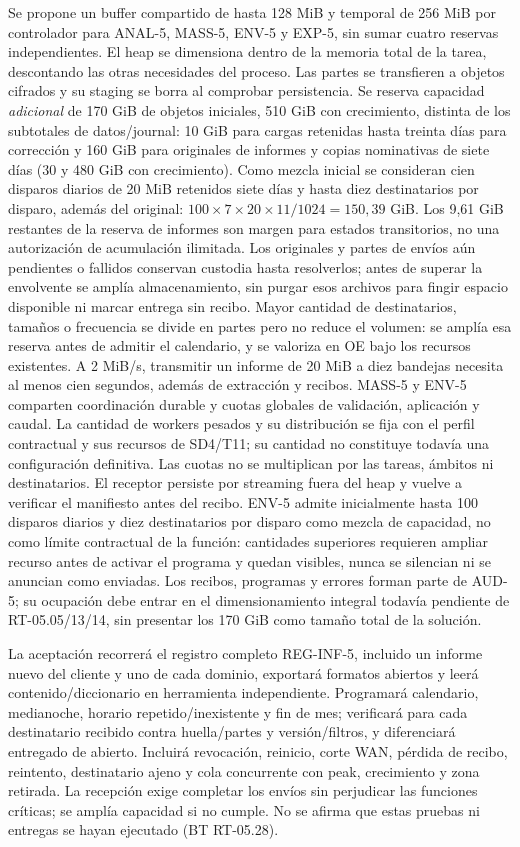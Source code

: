 Se propone un buffer compartido de hasta 128 MiB y temporal de 256 MiB por controlador para ANAL-5, MASS-5, ENV-5 y EXP-5, sin sumar cuatro reservas independientes. El heap se dimensiona dentro de la memoria total de la tarea, descontando las otras necesidades del proceso. Las partes se transfieren a objetos cifrados y su staging se borra al comprobar persistencia. Se reserva capacidad \emph{adicional} de 170 GiB de objetos iniciales, 510 GiB con crecimiento, distinta de los subtotales de datos/journal: 10 GiB para cargas retenidas hasta treinta días para corrección y 160 GiB para originales de informes y copias nominativas de siete días (30 y 480 GiB con crecimiento). Como mezcla inicial se consideran cien disparos diarios de 20 MiB retenidos siete días y hasta diez destinatarios por disparo, además del original: $100\times7\times20\times11/1024=150,39$ GiB. Los 9,61 GiB restantes de la reserva de informes son margen para estados transitorios, no una autorización de acumulación ilimitada. Los originales y partes de envíos aún pendientes o fallidos conservan custodia hasta resolverlos; antes de superar la envolvente se amplía almacenamiento, sin purgar esos archivos para fingir espacio disponible ni marcar entrega sin recibo. Mayor cantidad de destinatarios, tamaños o frecuencia se divide en partes pero no reduce el volumen: se amplía esa reserva antes de admitir el calendario, y se valoriza en OE bajo los recursos existentes. A 2 MiB/s, transmitir un informe de 20 MiB a diez bandejas necesita al menos cien segundos, además de extracción y recibos. MASS-5 y ENV-5 comparten coordinación durable y cuotas globales de validación, aplicación y caudal. La cantidad de workers pesados y su distribución se fija con el perfil contractual y sus recursos de SD4/T11; su cantidad no constituye todavía una configuración definitiva. Las cuotas no se multiplican por las tareas, ámbitos ni destinatarios. El receptor persiste por streaming fuera del heap y vuelve a verificar el manifiesto antes del recibo. ENV-5 admite inicialmente hasta 100 disparos diarios y diez destinatarios por disparo como mezcla de capacidad, no como límite contractual de la función: cantidades superiores requieren ampliar recurso antes de activar el programa y quedan visibles, nunca se silencian ni se anuncian como enviadas. Los recibos, programas y errores forman parte de AUD-5; su ocupación debe entrar en el dimensionamiento integral todavía pendiente de RT-05.05/13/14, sin presentar los 170 GiB como tamaño total de la solución.

La aceptación recorrerá el registro completo REG-INF-5, incluido un informe nuevo del cliente y uno de cada dominio, exportará formatos abiertos y leerá contenido/diccionario en herramienta independiente. Programará calendario, medianoche, horario repetido/inexistente y fin de mes; verificará para cada destinatario recibido contra huella/partes y versión/filtros, y diferenciará entregado de abierto. Incluirá revocación, reinicio, corte WAN, pérdida de recibo, reintento, destinatario ajeno y cola concurrente con peak, crecimiento y zona retirada. La recepción exige completar los envíos sin perjudicar las funciones críticas; se amplía capacidad si no cumple. No se afirma que estas pruebas ni entregas se hayan ejecutado (BT RT-05.28).

